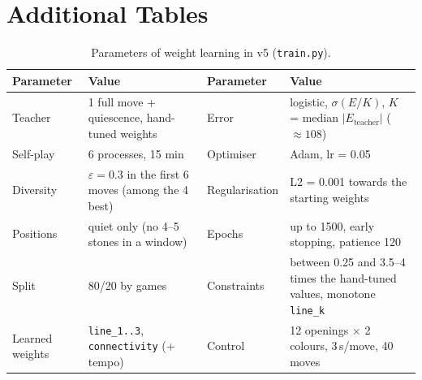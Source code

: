 \documentclass[a4paper,10pt,twocolumn]{article}
\newcommand{\code}[1]{\texttt{#1}}
\begin{document}
\section{Additional Tables}
\begin{table}[b]
\centering
\caption{Parameters of weight learning in v5 (\code{train.py}).}
\label{tab:hyper}
\begin{tabularx}{\textwidth}{@{}lXlX@{}}
\toprule
Parameter & Value & Parameter & Value \\
\midrule
Teacher & 1 full move + quiescence, hand-tuned weights & Error & logistic, $\sigma(E/K)$, $K$ = median $|E_{\text{teacher}}|$ ($\approx108$) \\
Self-play & 6 processes, 15 min & Optimiser & Adam, lr = 0.05 \\
Diversity & $\varepsilon=0.3$ in the first 6 moves (among the 4 best) & Regularisation & L2 = 0.001 towards the starting weights \\
Positions & quiet only (no 4--5 stones in a window) & Epochs & up to 1500, early stopping, patience 120 \\
Split & 80/20 by games & Constraints & between 0.25 and 3.5--4 times the hand-tuned values, monotone \code{line\_k} \\
Learned weights & \code{line\_1..3}, \code{connectivity} (+ tempo) & Control & 12 openings $\times$ 2 colours, 3\,s/move, 40 moves \\
\bottomrule
\end{tabularx}
\end{table}
\end{document}

